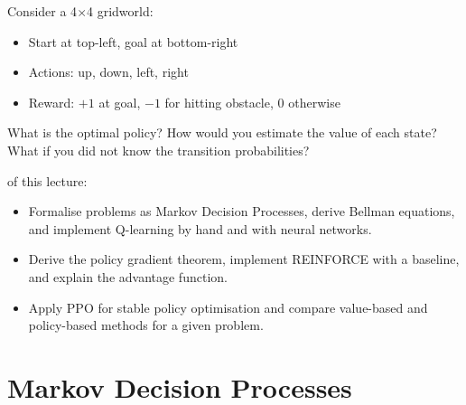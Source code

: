 \begin{marginfigure}
\caption{Gridworld: navigate from S to G, avoiding obstacles.}
\label{fig:gridworld}
\end{marginfigure}

Consider a 4$\times$4 gridworld:
\begin{itemize}
    \item Start at top-left, goal at bottom-right
    \item Actions: up, down, left, right
    \item Reward: $+1$ at goal, $-1$ for hitting obstacle, $0$ otherwise
\end{itemize}

What is the optimal policy? How would you estimate the value of each state? What if you did not know the transition probabilities?

 of this lecture:
\begin{itemize}
    \item Formalise problems as Markov Decision Processes, derive Bellman equations, and implement Q-learning by hand and with neural networks.
    \item Derive the policy gradient theorem, implement REINFORCE with a baseline, and explain the advantage function.
    \item Apply PPO for stable policy optimisation and compare value-based and policy-based methods for a given problem.
\end{itemize}


\newpage
\section{Markov Decision Processes}

